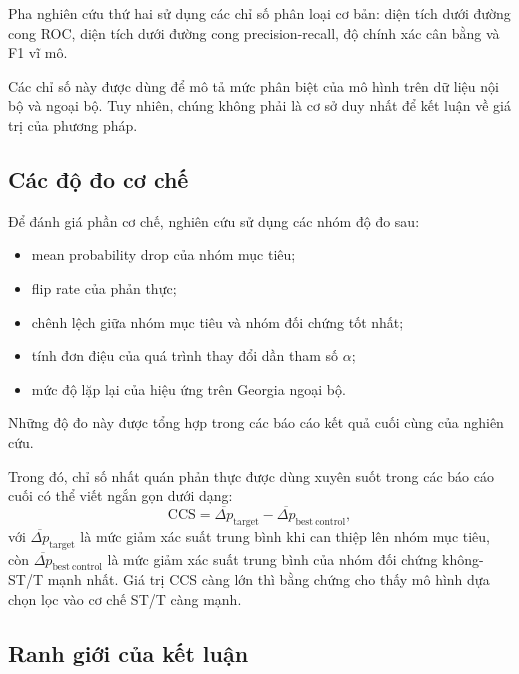 \blocksep

Pha nghiên cứu thứ hai sử dụng các chỉ số phân loại cơ bản: diện tích dưới đường cong ROC, diện tích dưới đường cong precision-recall, độ chính xác cân bằng và F1 vĩ mô.

\blocksep

Các chỉ số này được dùng để mô tả mức phân biệt của mô hình trên dữ liệu nội bộ và ngoại bộ. Tuy nhiên, chúng không phải là cơ sở duy nhất để kết luận về giá trị của phương pháp.

\blocksep

\subsection{Các độ đo cơ chế}

\blocksep

Để đánh giá phần cơ chế, nghiên cứu sử dụng các nhóm độ đo sau:

\renewcommand{\labelitemi}{$+$}
\begin{itemize}
	\item mean probability drop của nhóm mục tiêu;
	\item flip rate của phản thực;
	\item chênh lệch giữa nhóm mục tiêu và nhóm đối chứng tốt nhất;
	\item tính đơn điệu của quá trình thay đổi dần tham số \(\alpha\);
	\item mức độ lặp lại của hiệu ứng trên Georgia ngoại bộ.
\end{itemize}

\blocksep

Những độ đo này được tổng hợp trong các báo cáo kết quả cuối cùng của nghiên cứu.

\blocksep

Trong đó, chỉ số nhất quán phản thực được dùng xuyên suốt trong các báo cáo cuối có thể viết ngắn gọn dưới dạng:
\[
\mathrm{CCS} = \overline{\Delta p}_{\mathrm{target}} - \overline{\Delta p}_{\mathrm{best\ control}},
\]
với $\overline{\Delta p}_{\mathrm{target}}$ là mức giảm xác suất trung bình khi can thiệp lên nhóm mục tiêu, còn $\overline{\Delta p}_{\mathrm{best\ control}}$ là mức giảm xác suất trung bình của nhóm đối chứng không-ST/T mạnh nhất. Giá trị CCS càng lớn thì bằng chứng cho thấy mô hình dựa chọn lọc vào cơ chế ST/T càng mạnh.

\blocksep

\subsection{Ranh giới của kết luận}

